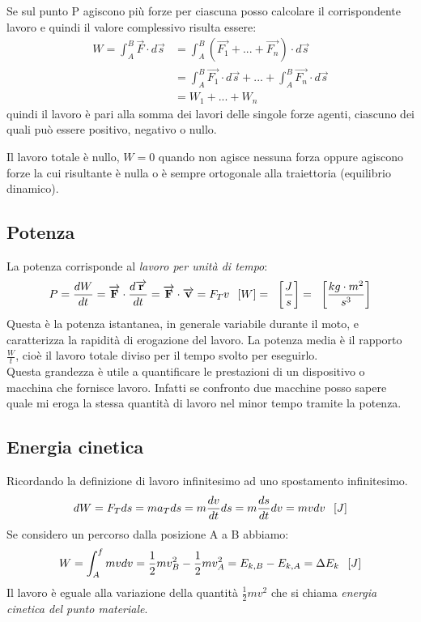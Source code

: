 \documentclass[class=book, crop=false, oneside, 12pt]{standalone}
\begin{document}
Se sul punto P agiscono più forze per ciascuna posso calcolare il corrispondente lavoro e quindi il valore complessivo risulta essere:
\begin{equation}
    \begin{split}
        W = \int_A^B \overrightarrow{F} \cdot d \overrightarrow{s} & = \int_A^B (\overrightarrow{F_1} + ... + \overrightarrow{F_n}) \cdot d \overrightarrow{s} \\
        & = \int_A^B \overrightarrow{F_1} \cdot d \overrightarrow{s} + ... + \int_A^B \overrightarrow{F_n} \cdot d \overrightarrow{s} \\
        & = W_1 + ... + W_n
    \end{split}
\end{equation}
quindi il lavoro è pari alla somma dei lavori delle singole forze agenti, ciascuno dei quali può essere positivo, negativo o nullo.

Il lavoro totale è nullo, \(W = 0\) quando non agisce nessuna forza oppure agiscono forze la cui risultante è nulla o è sempre ortogonale alla traiettoria (equilibrio dinamico).

\subsection{Potenza}

La potenza corrisponde al \emph{lavoro per unità di tempo}:
\begin{equation}
    P = \frac{dW}{dt} = \overrightarrow{F} \cdot \frac{d \overrightarrow{r}}{dt} = \overrightarrow{F} \cdot \overrightarrow{v} = F_T v \udm{W} = \udm{\frac{J}{s}} = \udm{\frac{kg \cdot m^2}{s^3}}
\end{equation}
Questa è la potenza istantanea, in generale variabile durante il moto, e caratterizza la rapidità di erogazione del lavoro. 
La potenza media è il rapporto \(\frac{W}{t}\), cioè il lavoro totale diviso per il tempo svolto per eseguirlo.\\
Questa grandezza è utile a quantificare le prestazioni di un dispositivo o macchina che fornisce lavoro. 
Infatti se confronto due macchine posso sapere quale mi eroga la stessa quantità di lavoro nel minor tempo tramite la potenza.

\subsection{Energia cinetica}

Ricordando la definizione di lavoro infinitesimo ad uno spostamento infinitesimo.
\begin{equation*}
    d W=F_T d s=m a_T d s=m \frac{d v}{d t} d s=m \frac{d s}{d t} d v=m v d v \hspace{0.2cm} \left[J\right]
\end{equation*}
Se considero un percorso dalla posizione A a B abbiamo:
\begin{equation}
    W=\int_{A}^{f} m v d v=\frac{1}{2} m v_{B}^{2}-\frac{1}{2} m v_{A}^{2}=E_{k, B}-E_{k, A}=\Delta E_{k} \hspace{0.2cm} \left[J\right]
\end{equation}
Il lavoro è eguale alla variazione della quantità \(\frac{1}{2} m v^2\) che si chiama \emph{energia cinetica del punto materiale}.
\end{document}
